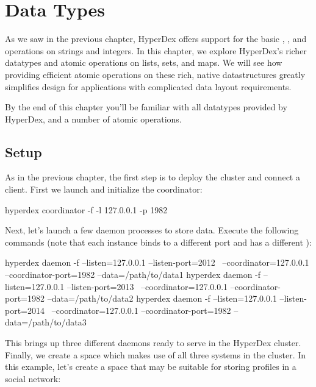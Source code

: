 \chapter{Data Types}
\label{chap:data-types}

As we saw in the previous chapter, HyperDex offers support for the basic
, , and  operations on strings and integers.
In this chapter, we explore HyperDex's richer datatypes and atomic operations on
lists, sets, and maps.  We will see how providing efficient atomic operations on
these rich, native datastructures greatly simplifies design for applications
with complicated data layout requirements.

By the end of this chapter you'll be familiar with all datatypes provided by
HyperDex, and a number of atomic operations.

\section{Setup}
\label{sec:data-types:setup}

As in the previous chapter, the first step is to deploy the cluster and connect
a client.   First we launch and initialize the coordinator:

\begin{consolecode}
hyperdex coordinator -f -l 127.0.0.1 -p 1982
\end{consolecode}

Next, let's launch a few daemon processes to store data.  Execute the following
commands (note that each instance binds to a different port and has a different
):

\begin{consolecode}
hyperdex daemon -f --listen=127.0.0.1 --listen-port=2012 \
                   --coordinator=127.0.0.1 --coordinator-port=1982 --data=/path/to/data1
hyperdex daemon -f --listen=127.0.0.1 --listen-port=2013 \
                   --coordinator=127.0.0.1 --coordinator-port=1982 --data=/path/to/data2
hyperdex daemon -f --listen=127.0.0.1 --listen-port=2014 \
                   --coordinator=127.0.0.1 --coordinator-port=1982 --data=/path/to/data3
\end{consolecode}

This brings up three different daemons ready to serve in the HyperDex cluster.
Finally, we create a space which makes use of all three systems in the cluster.
In this example, let's create a space that may be suitable for storing profiles
in a social network:

